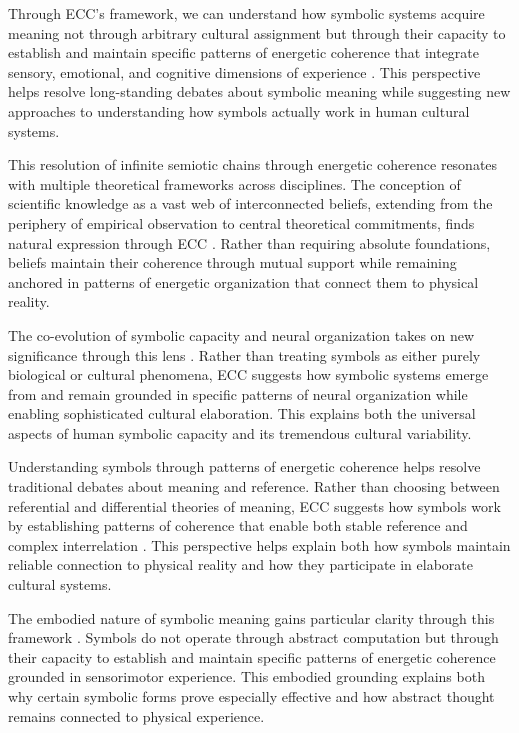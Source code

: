 Through ECC's framework, we can understand how symbolic systems acquire meaning not through arbitrary cultural assignment but through their capacity to establish and maintain specific patterns of energetic coherence that integrate sensory, emotional, and cognitive dimensions of experience \cite{varela1991embodied}. This perspective helps resolve long-standing debates about symbolic meaning while suggesting new approaches to understanding how symbols actually work in human cultural systems.

This resolution of infinite semiotic chains through energetic coherence resonates with multiple theoretical frameworks across disciplines. The conception of scientific knowledge as a vast web of interconnected beliefs, extending from the periphery of empirical observation to central theoretical commitments, finds natural expression through ECC \cite{quine1960word}. Rather than requiring absolute foundations, beliefs maintain their coherence through mutual support while remaining anchored in patterns of energetic organization that connect them to physical reality.

The co-evolution of symbolic capacity and neural organization takes on new significance through this lens \cite{deacon1997symbolic}. Rather than treating symbols as either purely biological or cultural phenomena, ECC suggests how symbolic systems emerge from and remain grounded in specific patterns of neural organization while enabling sophisticated cultural elaboration. This explains both the universal aspects of human symbolic capacity and its tremendous cultural variability.

Understanding symbols through patterns of energetic coherence helps resolve traditional debates about meaning and reference. Rather than choosing between referential and differential theories of meaning, ECC suggests how symbols work by establishing patterns of coherence that enable both stable reference and complex interrelation \cite{searle1980minds}. This perspective helps explain both how symbols maintain reliable connection to physical reality and how they participate in elaborate cultural systems.

The embodied nature of symbolic meaning gains particular clarity through this framework \cite{hutchins1995cognition}. Symbols do not operate through abstract computation but through their capacity to establish and maintain specific patterns of energetic coherence grounded in sensorimotor experience. This embodied grounding explains both why certain symbolic forms prove especially effective and how abstract thought remains connected to physical experience.

